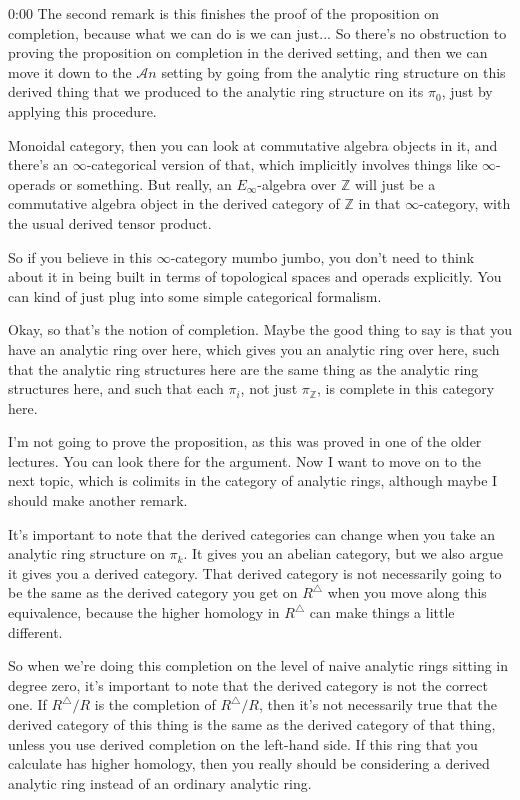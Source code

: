 \begin{unfinished}{0:00}
The second remark is this finishes the proof of the proposition on completion, because what we can do is we can just... So there's no obstruction to proving the proposition on completion in the derived setting, and then we can move it down to the $\mathcal{A}n$ setting by going from the analytic ring structure on this derived thing that we produced to the analytic ring structure on its $\pi_0$, just by applying this procedure.

Monoidal category, then you can look at commutative algebra objects in it, and there's an $\infty$-categorical version of that, which implicitly involves things like $\infty$-operads or something. But really, an $E_\infty$-algebra over $\mathbb{Z}$ will just be a commutative algebra object in the derived category of $\mathbb{Z}$ in that $\infty$-category, with the usual derived tensor product.

So if you believe in this $\infty$-category mumbo jumbo, you don't need to think about it in being built in terms of topological spaces and operads explicitly. You can kind of just plug into some simple categorical formalism.

Okay, so that's the notion of completion. Maybe the good thing to say is that you have an analytic ring over here, which gives you an analytic ring over here, such that the analytic ring structures here are the same thing as the analytic ring structures here, and such that each $\pi_i$, not just $\pi_\mathbb{Z}$, is complete in this category here.

I'm not going to prove the proposition, as this was proved in one of the older lectures. You can look there for the argument. Now I want to move on to the next topic, which is colimits in the category of analytic rings, although maybe I should make another remark.

It's important to note that the derived categories can change when you take an analytic ring structure on $\pi_k$. It gives you an abelian category, but we also argue it gives you a derived category. That derived category is not necessarily going to be the same as the derived category you get on $R^\triangle$ when you move along this equivalence, because the higher homology in $R^\triangle$ can make things a little different. 

So when we're doing this completion on the level of naive analytic rings sitting in degree zero, it's important to note that the derived category is not the correct one. If $R^\triangle /R$ is the completion of $R^\triangle /R$, then it's not necessarily true that the derived category of this thing is the same as the derived category of that thing, unless you use derived completion on the left-hand side. If this ring that you calculate has higher homology, then you really should be considering a derived analytic ring instead of an ordinary analytic ring.


\end{unfinished}
